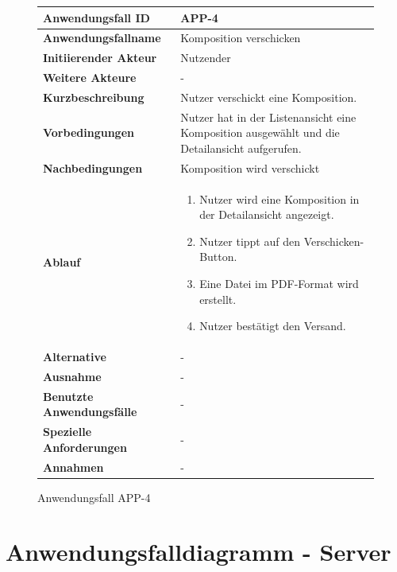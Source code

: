 \begin{figure}[h]
	\centering
	\begin{tabularx}{\textwidth}{ X | X }
		\textbf{Anwendungsfall ID} & APP-4 \\ \hline
		\textbf{Anwendungsfallname} & Komposition verschicken \\ \hline
		\textbf{Initiierender Akteur} & Nutzender
		 \\ \hline
		\textbf{Weitere Akteure} & -  \\ \hline
		\textbf{Kurzbeschreibung} & Nutzer verschickt eine Komposition.  \\ \hline
		\textbf{Vorbedingungen} & Nutzer hat in der Listenansicht eine Komposition ausgewählt und die Detailansicht aufgerufen.  \\ \hline
		\textbf{Nachbedingungen} & Komposition wird verschickt  \\ \hline
		\textbf{Ablauf} &
		\begin{enumerate}
			\item Nutzer wird eine Komposition in der Detailansicht angezeigt.
			\item Nutzer tippt auf den Verschicken-Button.
			\item Eine Datei im PDF-Format wird erstellt.
			\item Nutzer bestätigt den Versand.
		\end{enumerate} \\ \hline
		\textbf{Alternative} &
		-  \\ \hline
		\textbf{Ausnahme} &
		- \\ \hline
		\textbf{Benutzte Anwendungsfälle} & - \\ \hline
		\textbf{Spezielle Anforderungen} & - \\ \hline
		\textbf{Annahmen} & -
	\end{tabularx}
	\caption{Anwendungsfall APP-4}
	\label{fig:anwendungsfall-app-tabelle-APP-4}
\end{figure}

\newpage


\section{Anwendungsfalldiagramm - Server}

